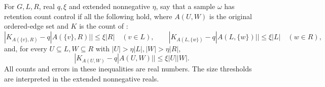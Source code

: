 \begin{definition}
For $G,L,R$, real $q,\xi$ and extended nonnegative $\eta$, say that a
sample $\omega$ has retention count control if all the following hold,
where $A(U,W)$ is the original ordered-edge set and $K$ is the count of
:
\[
|K_{A(\{v\},R)}-q|A(\{v\},R)||\leq\xi|R|\quad(v\in L),
\qquad
|K_{A(L,\{w\})}-q|A(L,\{w\})||\leq\xi|L|\quad(w\in R),
\]
and, for every $U\subseteq L,W\subseteq R$ with
$|U|>\eta|L|,|W|>\eta|R|$,
\[
|K_{A(U,W)}-q|A(U,W)||\leq\xi|U||W|.
\]
All counts and errors in these inequalities are real numbers. The size
thresholds are interpreted in the extended nonnegative reals.
\end{definition}
